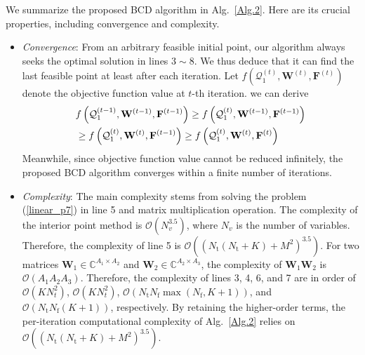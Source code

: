 \documentclass[10pt,journal,twocolumn]{IEEEtran}
\begin{document}
We summarize the proposed BCD algorithm in Alg.~\ref{Alg.2}. Here are its crucial properties, including convergence and complexity.
\begin{itemize}
\item  \emph{Convergence}: From an arbitrary feasible initial point, our algorithm always seeks the optimal solution in lines $3\sim 8$. We thus deduce that it can find the last feasible point at least after each iteration. Let $f\left(\mathcal{Q}^{(t)}_1,\mathbf{W}^{(t)},\mathbf{F}^{(t)}\right)$ denote the objective function value at $t$-th iteration. we can derive
\begin{align}
&f\left(\mathcal{Q}^{(t-1)}_1,\mathbf{W}^{(t-1)},\mathbf{F}^{(t-1)}\right)\geq f\left(\mathcal{Q}^{(t)}_1,\mathbf{W}^{(t-1)},\mathbf{F}^{(t-1)}\right)\notag\\&\geq f\left(\mathcal{Q}^{(t)}_1,\mathbf{W}^{(t)},\mathbf{F}^{(t-1)}\right)\geq f\left(\mathcal{Q}^{(t)}_1,\mathbf{W}^{(t)},\mathbf{F}^{(t)}\right)
 \label{convergence}
\end{align}
Meanwhile, since objective function value cannot be reduced infinitely, the proposed BCD algorithm converges within a finite number of iterations.

\item \emph{Complexity}: The main complexity stems from solving the problem (\ref{linear_p7}) in line 5 and matrix multiplication operation. The complexity of the interior point method is $\mathcal O\left(N_v^{3.5}\right)$, where $N_v$ is the number of variables. Therefore, the complexity of line 5 is $\mathcal O\left(\left(N_{\text{t}}(N_{\text{t}}+K)+M^2\right)^{3.5}\right)$. For two matrices $\mathbf{W}_1\in\mathbb C^{ A_1\times A_2}$ and $\mathbf{W}_2\in\mathbb C^{ A_2\times A_3}$, the complexity of $\mathbf{W}_1\mathbf{W}_2$ is $\mathcal O\left(A_1A_2A_3\right)$. Therefore, the complexity of lines 3, 4, 6, and 7 are in order of $\mathcal O\left(KN^2_t\right)$, $\mathcal O\left(KN^2_t\right)$, $\mathcal O\left(N_{\text{t}}N_{\text{f}}\max\left(N_{\text{f}}, K+1\right)\right)$, and $\mathcal O\left(N_{\text{t}}N_{\text{f}}(K+1)\right)$, respectively. By retaining the higher-order terms, the per-iteration computational complexity of Alg.~\ref{Alg.2} relies on $\mathcal O\left(\left(N_{\text{t}}(N_{\text{t}}+K)+M^2\right)^{3.5}\right)$.
\end{itemize}
\end{document}
